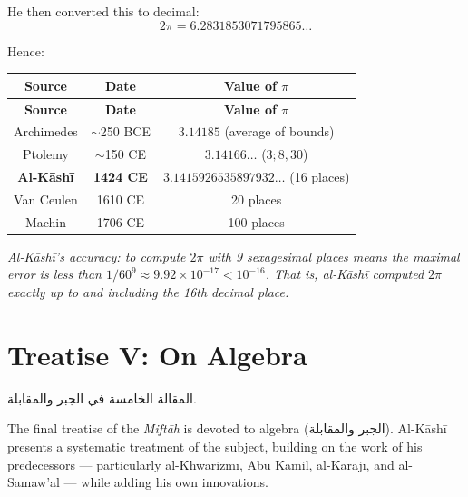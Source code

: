 \documentclass[11pt,a4paper]{article}
\newenvironment{arabicbox}{%
  \begin{framed}
  \begin{minipage}{\linewidth-2\fboxsep-2\fboxrule}
  \setlength{\parindent}{0pt}
  \linespread{1.3}\selectfont
}{%
  \end{minipage}
  \end{framed}
}
\newcommand{\cnote}[1]{\textcolor{notecolor}{\textit{#1}}}
\newcommand{\ar}[1]{{\arabicfont\beginR #1\endR}}
\begin{document}
\noindent He then converted this to decimal:
\[
2\pi = 6.2831853071795865\ldots
\]

\noindent Hence:
\begin{center}
\fbox{$\pi = 3.1415926535897932\ldots$}
\end{center}

\begin{longtable}{|c|c|c|}
\hline
\textbf{Source} & \textbf{Date} & \textbf{Value of $\pi$} \\
\hline
\endfirsthead
\hline
\textbf{Source} & \textbf{Date} & \textbf{Value of $\pi$} \\
\hline
\endhead
Archimedes & $\sim$250 BCE & $3.14185$ (average of bounds) \\
\hline
Ptolemy & $\sim$150 CE & $3.14166\ldots$ ($3; 8, 30$) \\
\hline
\textbf{Al-K\=ash\=i} & \textbf{1424 CE} & $\mathbf{3.1415926535897932\ldots}$
(16 places) \\
\hline
Van Ceulen & 1610 CE & 20 places \\
\hline
Machin & 1706 CE & 100 places \\
\hline
\end{longtable}

\cnote{Al-K\=ash\=i's accuracy: to compute $2\pi$ with 9 sexagesimal
places means the maximal error is less than $1/60^9 \approx 9.92 \times
10^{-17} < 10^{-16}$. That is, al-K\=ash\=i computed $2\pi$ exactly up to
and including the 16th decimal place.}
\clearpage

\section{Treatise V: On Algebra}
\label{sec:treatise5}

\begin{arabicbox}
\begin{Arabic}
المقالة الخامسة في الجبر والمقابلة.
\end{Arabic}
\end{arabicbox}

\vspace{0.3cm}

\noindent The final treatise of the \textit{Mift\=ah} is devoted to algebra
(\ar{الجبر والمقابلة}). Al-K\=ash\=i presents a systematic treatment of
the subject, building on the work of his predecessors --- particularly
al-Khw\=arizm\=i, Ab\=u K\=amil, al-Karaj\=i, and al-Samaw'al --- while adding his
own innovations.
\end{document}
